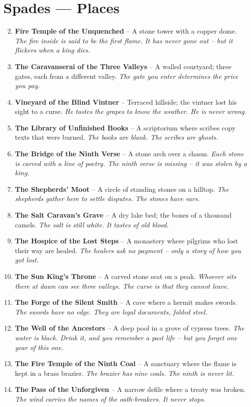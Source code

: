 \documentclass[11pt]{book}
\begin{document}
\section*{Spades — Places}
\begin{enumerate}
\setcounter{enumi}{1}
\item \textbf{Fire Temple of the Unquenched} – A stone tower with a copper dome. \textit{The fire inside is said to be the first flame. It has never gone out – but it flickers when a king dies.}
\item \textbf{The Caravanserai of the Three Valleys} – A walled courtyard; three gates, each from a different valley. \textit{The gate you enter determines the price you pay.}
\item \textbf{Vineyard of the Blind Vintner} – Terraced hillside; the vintner lost his sight to a curse. \textit{He tastes the grapes to know the weather. He is never wrong.}
\item \textbf{The Library of Unfinished Books} – A scriptorium where scribes copy texts that were burned. \textit{The books are blank. The scribes are ghosts.}
\item \textbf{The Bridge of the Ninth Verse} – A stone arch over a chasm. \textit{Each stone is carved with a line of poetry. The ninth verse is missing – it was stolen by a king.}
\item \textbf{The Shepherds’ Moot} – A circle of standing stones on a hilltop. \textit{The shepherds gather here to settle disputes. The stones have ears.}
\item \textbf{The Salt Caravan’s Grave} – A dry lake bed; the bones of a thousand camels. \textit{The salt is still white. It tastes of old blood.}
\item \textbf{The Hospice of the Lost Steps} – A monastery where pilgrims who lost their way are healed. \textit{The healers ask no payment – only a story of how you got lost.}
\item \textbf{The Sun King’s Throne} – A carved stone seat on a peak. \textit{Whoever sits there at dawn can see three valleys. The curse is that they cannot leave.}
\item[J] \textbf{The Forge of the Silent Smith} – A cave where a hermit makes swords. \textit{The swords have no edge. They are legal documents, folded steel.}
\item[Q] \textbf{The Well of the Ancestors} – A deep pool in a grove of cypress trees. \textit{The water is black. Drink it, and you remember a past life – but you forget one year of this one.}
\item[K] \textbf{The Fire Temple of the Ninth Coal} – A sanctuary where the flame is kept in a brass brazier. \textit{The brazier has nine coals. The ninth is never lit.}
\item[A] \textbf{The Pass of the Unforgiven} – A narrow defile where a treaty was broken. \textit{The wind carries the names of the oath‑breakers. It never stops.}
\end{enumerate}
\end{document}
